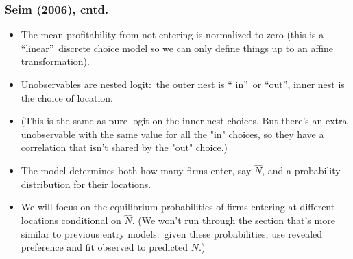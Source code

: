 \begin{frame}%

\frametitle{Seim (2006), cntd.}

\begin{itemize}
\item The mean profitability from not entering is normalized to zero (this
is a \textquotedblleft linear\textquotedblright\ discrete choice model so we
can only define things up to an affine transformation).

\item Unobservables are nested logit:\ the outer nest is \textquotedblleft
in\textquotedblright\ or \textquotedblleft out\textquotedblright , inner
nest is the choice of location.

\item (This is the same as pure logit on the inner nest choices. But there's
an extra unobservable with the same value for all the "in" choices, so they
have a correlation that isn't shared by the "out" choice.)

\item The model determines both how many firms enter, say $\hat{N}$, and a
probability distribution for their locations.

\item We will focus on the equilibrium probabilities of firms entering at
different locations conditional on $\hat{N}$. (We won't run through the
section that's more similar to previous entry models:\ given these
probabilities, use revealed preference and fit observed to predicted $N$.)
\end{itemize}

\end{frame}%


